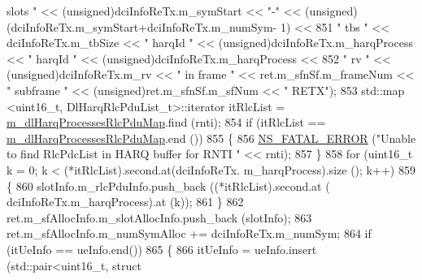 \begin{DoxyCode}
{       slots "} << (\textcolor{keywordtype}{unsigned})dciInfoReTx.m\_symStart << \textcolor{stringliteral}{"-"} << (\textcolor{keywordtype}{unsigned})(dciInfoReTx.m\_symStart+dciInfoReTx.m\_numSym-
      1) <<
851                                                                      \textcolor{stringliteral}{" tbs "} << dciInfoReTx.m\_tbSize << \textcolor{stringliteral}{"
       harqId "} << (\textcolor{keywordtype}{unsigned})dciInfoReTx.m\_harqProcess << \textcolor{stringliteral}{" harqId "} << (\textcolor{keywordtype}{unsigned})dciInfoReTx.m\_harqProcess <<
852                                                                      \textcolor{stringliteral}{" rv "} << (\textcolor{keywordtype}{unsigned})dciInfoReTx.m\_rv 
      << \textcolor{stringliteral}{" in frame "} << ret.m\_sfnSf.m\_frameNum << \textcolor{stringliteral}{" subframe "} << (\textcolor{keywordtype}{unsigned})ret.m\_sfnSf.m\_sfNum << \textcolor{stringliteral}{" RETX"});
853                                         std::map <uint16\_t, DlHarqRlcPduList\_t>::iterator itRlcList =  
      \hyperlink{classns3_1_1MmWaveFlexTtiMacScheduler_a7b37cf0428128dbfe578cd3c5d3ffbe9}{m\_dlHarqProcessesRlcPduMap}.find (rnti);
854                                         \textcolor{keywordflow}{if} (itRlcList == 
      \hyperlink{classns3_1_1MmWaveFlexTtiMacScheduler_a7b37cf0428128dbfe578cd3c5d3ffbe9}{m\_dlHarqProcessesRlcPduMap}.end ())
855                                         \{
856                                                 \hyperlink{group__fatal_ga5131d5e3f75d7d4cbfd706ac456fdc85}{NS\_FATAL\_ERROR} (\textcolor{stringliteral}{"Unable to find RlcPdcList in
       HARQ buffer for RNTI "} << rnti);
857                                         \}
858                                         \textcolor{keywordflow}{for} (uint16\_t k = 0; k < (*itRlcList).second.at(dciInfoReTx.
      m\_harqProcess).size (); k++)
859                                         \{
860                                                 slotInfo.m\_rlcPduInfo.push\_back ((*itRlcList).second.at (
      dciInfoReTx.m\_harqProcess).at (k));
861                                         \}
862                                         ret.m\_sfAllocInfo.m\_slotAllocInfo.push\_back (slotInfo);
863                                         ret.m\_sfAllocInfo.m\_numSymAlloc += dciInfoReTx.m\_numSym;
864                                         \textcolor{keywordflow}{if} (itUeInfo == ueInfo.end())
865                                         \{
866                                                 itUeInfo = ueInfo.insert (std::pair<uint16\_t, struct

\end{DoxyCode}
